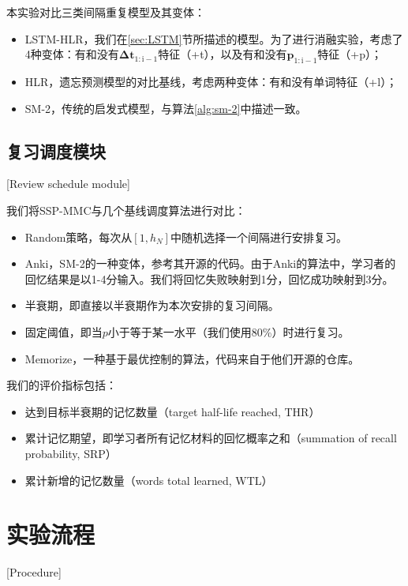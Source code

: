 本实验对比三类间隔重复模型及其变体：

\begin{itemize}
    \item LSTM-HLR，我们在\ref{sec:LSTM}节所描述的模型。为了进行消融实验，考虑了4种变体：有和没有$\bm{\Delta t}_\mathrm{1:i-1}$特征（+t），以及有和没有$\bm p_\mathrm{1:i-1}$特征（+p）；
    \item HLR，遗忘预测模型的对比基线，考虑两种变体：有和没有单词特征（+l）；
    \item SM-2，传统的启发式模型，与算法\ref{alg:sm-2}中描述一致。
\end{itemize}

\subsection{复习调度模块}[Review schedule module]

我们将SSP-MMC与几个基线调度算法进行对比：

\begin{itemize}
    \item Random策略，每次从$[1,h_N]$中随机选择一个间隔进行安排复习。
    \item Anki，SM-2的一种变体，参考其开源的代码。由于Anki的算法中，学习者的回忆结果是以1-4分输入。我们将回忆失败映射到1分，回忆成功映射到3分。
    \item 半衰期，即直接以半衰期作为本次安排的复习间隔。
    \item 固定阈值，即当$p$小于等于某一水平（我们使用80\%）时进行复习。
    \item Memorize\cite{tabibianEnhancingHumanLearning2019}，一种基于最优控制的算法，代码来自于他们开源的仓库。
\end{itemize}

我们的评价指标包括：

\begin{itemize}
    \item 达到目标半衰期的记忆数量（target half-life reached, THR）
    \item 累计记忆期望，即学习者所有记忆材料的回忆概率之和（summation of recall probability, SRP）
    \item 累计新增的记忆数量（words total learned, WTL）
\end{itemize}

\section{实验流程}[Procedure]

